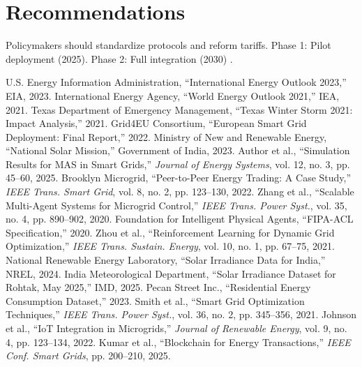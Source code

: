 \documentclass[12pt]{report}
\begin{document}
\section{Recommendations}
Policymakers should standardize protocols and reform tariffs. Phase 1: Pilot deployment (2025). Phase 2: Full integration (2030) \cite{mnre2023}.

\clearpage
{}
\begin{thebibliography}{99}
 U.S. Energy Information Administration, ``International Energy Outlook 2023,'' EIA, 2023.
 International Energy Agency, ``World Energy Outlook 2021,'' IEA, 2021.
 Texas Department of Emergency Management, ``Texas Winter Storm 2021: Impact Analysis,'' 2021.
 Grid4EU Consortium, ``European Smart Grid Deployment: Final Report,'' 2022.
 Ministry of New and Renewable Energy, ``National Solar Mission,'' Government of India, 2023.
 Author et al., ``Simulation Results for MAS in Smart Grids,'' \emph{Journal of Energy Systems}, vol. 12, no. 3, pp. 45--60, 2025.
 Brooklyn Microgrid, ``Peer-to-Peer Energy Trading: A Case Study,'' \emph{IEEE Trans. Smart Grid}, vol. 8, no. 2, pp. 123--130, 2022.
 Zhang et al., ``Scalable Multi-Agent Systems for Microgrid Control,'' \emph{IEEE Trans. Power Syst.}, vol. 35, no. 4, pp. 890--902, 2020.
 Foundation for Intelligent Physical Agents, ``FIPA-ACL Specification,'' 2020.
 Zhou et al., ``Reinforcement Learning for Dynamic Grid Optimization,'' \emph{IEEE Trans. Sustain. Energy}, vol. 10, no. 1, pp. 67--75, 2021.
 National Renewable Energy Laboratory, ``Solar Irradiance Data for India,'' NREL, 2024.
 India Meteorological Department, ``Solar Irradiance Dataset for Rohtak, May 2025,'' IMD, 2025.
 Pecan Street Inc., ``Residential Energy Consumption Dataset,'' 2023.
 Smith et al., ``Smart Grid Optimization Techniques,'' \emph{IEEE Trans. Power Syst.}, vol. 36, no. 2, pp. 345--356, 2021.
 Johnson et al., ``IoT Integration in Microgrids,'' \emph{Journal of Renewable Energy}, vol. 9, no. 4, pp. 123--134, 2022.
 Kumar et al., ``Blockchain for Energy Transactions,'' \emph{IEEE Conf. Smart Grids}, pp. 200--210, 2025.
\end{thebibliography}
\end{document}
